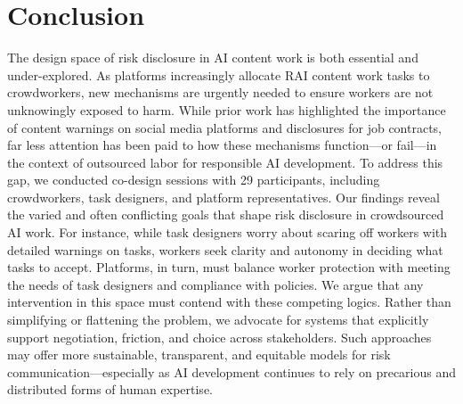 \section{Conclusion}
The design space of risk disclosure in AI content work is both essential and under-explored. As platforms increasingly allocate RAI content work tasks to crowdworkers, new mechanisms are urgently needed to ensure workers are not unknowingly exposed to harm. While prior work has highlighted the importance of content warnings on social media platforms and disclosures for job contracts, far less attention has been paid to how these mechanisms function—or fail—in the context of outsourced labor for responsible AI development. To address this gap, we conducted co-design sessions with 29 participants, including crowdworkers, task designers, and platform representatives. Our findings reveal the varied and often conflicting goals that shape risk disclosure in crowdsourced AI work. For instance, while task designers worry about scaring off workers with detailed warnings on tasks, workers seek clarity and autonomy in deciding what tasks to accept. Platforms, in turn, must balance worker protection with meeting the needs of task designers and compliance with policies. We argue that any intervention in this space must contend with these competing logics. Rather than simplifying or flattening the problem, we advocate for systems that explicitly support negotiation, friction, and choice across stakeholders. Such approaches may offer more sustainable, transparent, and equitable models for risk communication---especially as AI development continues to rely on precarious and distributed forms of human expertise.
